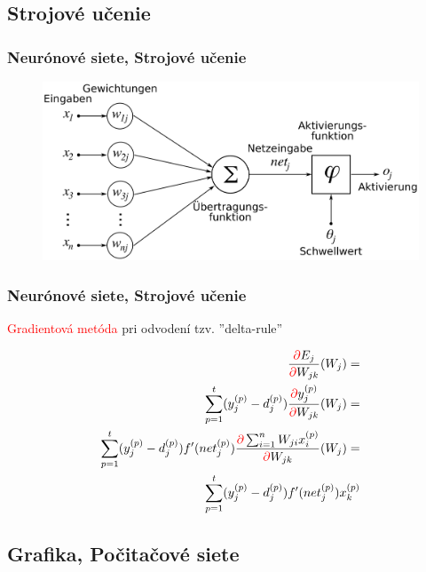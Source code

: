 \documentclass{beamer}
\begin{document}
\subsection{Strojové učenie}

\begin{frame}
\frametitle{Neurónové siete, Strojové učenie}
\begin{figure}
\includegraphics[height=0.6\textheight]{images/neural_net.png}
\end{figure}
\end{frame}

\begin{frame}
\frametitle{Neurónové siete, Strojové učenie}

\textcolor{red}{Gradientová metóda} pri odvodení tzv. ''delta-rule''

\def\rpartial{\textcolor{red}{\partial}}

\begin{align*}
\dfrac{\rpartial E_j}{\rpartial W_{jk}} (W_j) = \\
\sum_{p=1}^{t} (y^{(p)}_j - d^{(p)}_j)     \dfrac{\rpartial y^{(p)}_j} {\rpartial W_{jk}} (W_j)= \\
\sum_{p=1}^{t} (y^{(p)}_j - d^{(p)}_j)     f'(net_j^{(p)}) \dfrac{\rpartial \sum_{i=1}^{n} W_{ji} x_i^{(p)}}{\rpartial W_{jk}} (W_j)= \\
\sum_{p=1}^{t} (y^{(p)}_j - d^{(p)}_j)     f'(net_j^{(p)}) x_k^{(p)} \\
\end{align*}

\end{frame}

\subsection{Grafika, Počitačové siete}
\end{document}
